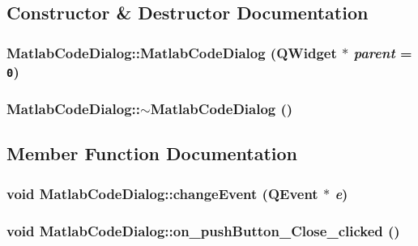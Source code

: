 \subsection{Constructor \& Destructor Documentation}
\hypertarget{class_matlab_code_dialog_c8f426b6c0d5a18f007d9bcd25bac51e}{
\subsubsection[{MatlabCodeDialog}]{\setlength{\rightskip}{0pt plus 5cm}MatlabCodeDialog::MatlabCodeDialog (QWidget $\ast$ {\em parent} = {\tt 0})}}
\label{class_matlab_code_dialog_c8f426b6c0d5a18f007d9bcd25bac51e}


\hypertarget{class_matlab_code_dialog_a6c34fec5d8fb8785ac7cac54eb5956b}{
\subsubsection[{$\sim$MatlabCodeDialog}]{\setlength{\rightskip}{0pt plus 5cm}MatlabCodeDialog::$\sim$MatlabCodeDialog ()}}
\label{class_matlab_code_dialog_a6c34fec5d8fb8785ac7cac54eb5956b}




\subsection{Member Function Documentation}
\hypertarget{class_matlab_code_dialog_1bf85b91350be2d1afcd427d7b473591}{
\subsubsection[{changeEvent}]{\setlength{\rightskip}{0pt plus 5cm}void MatlabCodeDialog::changeEvent (QEvent $\ast$ {\em e})}}
\label{class_matlab_code_dialog_1bf85b91350be2d1afcd427d7b473591}


\hypertarget{class_matlab_code_dialog_def9f0ceedb03979b45a05321a944866}{
\subsubsection[{on\_\-pushButton\_\-Close\_\-clicked}]{\setlength{\rightskip}{0pt plus 5cm}void MatlabCodeDialog::on\_\-pushButton\_\-Close\_\-clicked ()}}
\label{class_matlab_code_dialog_def9f0ceedb03979b45a05321a944866}


